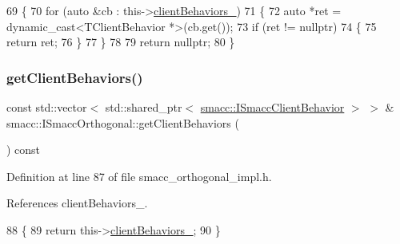 \begin{DoxyCode}
69 \{
70     \textcolor{keywordflow}{for} (\textcolor{keyword}{auto} &cb : this->\hyperlink{classsmacc_1_1ISmaccOrthogonal_a02df51ab34a478841c54cbbba1b161c3}{clientBehaviors\_})
71     \{
72         \textcolor{keyword}{auto} *ret = \textcolor{keyword}{dynamic\_cast<}TClientBehavior *\textcolor{keyword}{>}(cb.get());
73         \textcolor{keywordflow}{if} (ret != \textcolor{keyword}{nullptr})
74         \{
75             \textcolor{keywordflow}{return} ret;
76         \}
77     \}
78 
79     \textcolor{keywordflow}{return} \textcolor{keyword}{nullptr};
80 \}
\end{DoxyCode}
\mbox{\label{classsmacc_1_1ISmaccOrthogonal_adf67a263e149fc2e96591484b5e9c7aa}} 
\subsubsection{\texorpdfstring{get\+Client\+Behaviors()}{getClientBehaviors()}}
{\footnotesize\ttfamily const std\+::vector$<$ std\+::shared\+\_\+ptr$<$ \hyperlink{classsmacc_1_1ISmaccClientBehavior}{smacc\+::\+I\+Smacc\+Client\+Behavior} $>$ $>$ \& smacc\+::\+I\+Smacc\+Orthogonal\+::get\+Client\+Behaviors (\begin{DoxyParamCaption}{ }\end{DoxyParamCaption}) const\hspace{0.3cm}{\ttfamily [inline]}}



Definition at line 87 of file smacc\+\_\+orthogonal\+\_\+impl.\+h.



References client\+Behaviors\+\_\+.


\begin{DoxyCode}
88 \{
89     \textcolor{keywordflow}{return} this->\hyperlink{classsmacc_1_1ISmaccOrthogonal_a02df51ab34a478841c54cbbba1b161c3}{clientBehaviors\_};
90 \}
\end{DoxyCode}
\mbox{\label{classsmacc_1_1ISmaccOrthogonal_a83f1d5390ec41d91566e6f034b25b7d9}} 
